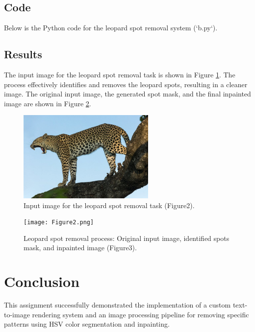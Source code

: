 \documentclass[12pt]{article}
\begin{document}
\subsection*{Code}
Below is the Python code for the leopard spot removal system (`b.py`).


\subsection*{Results}
The input image for the leopard spot removal task is shown in Figure \ref{fig:input_image_q2}. The process effectively identifies and removes the leopard spots, resulting in a cleaner image. The original input image, the generated spot mask, and the final inpainted image are shown in Figure \ref{fig:leopard_spot_removal}.

\begin{figure}[h!]
    \centering
    \includegraphics[width=0.6\textwidth]{image.jpg} %
    \caption{Input image for the leopard spot removal task (Figure2).}
    \label{fig:input_image_q2}
\end{figure}

\begin{figure}[h!]
    \centering
    \texttt{[image: Figure2.png]} %
    \caption{Leopard spot removal process: Original input image, identified spots mask, and inpainted image (Figure3).}
    \label{fig:leopard_spot_removal}
\end{figure}

\section*{Conclusion}
This assignment successfully demonstrated the implementation of a custom text-to-image rendering system and an image processing pipeline for removing specific patterns using HSV color segmentation and inpainting.
\end{document}
